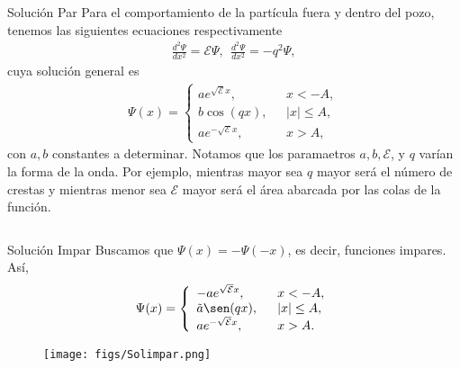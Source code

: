 \documentclass[aspectratio=1610]{beamer}
\begin{document}
\begin{frame}{Solución Par}
Para el comportamiento de la partícula fuera y dentro del pozo, tenemos las siguientes ecuaciones respectivamente
 \begin{align*}
     \frac{d^2\Psi}{dx^2} = \mathcal{E}\Psi, \:\:      \frac{d^2\Psi}{dx^2} = -q^2\Psi,
 \end{align*}
cuya solución general es 
\begin{align}
        \Psi(x) = 
        \left\{ \begin{array}{ll}
        ae^{\sqrt{\mathcal{E}}x},& \:\:\:  x < -A,
        \\
        b\cos(qx), & \:\:\: |x| \leq A,
        \\
        ae^{-\sqrt{\mathcal{E}}x},& \:\:\: x > A,
        \end{array}
        \right.
        \label{eq:Solpar}
\end{align}
con $a, b$ constantes a determinar. Notamos que los paramaetros
$a,b,\mathcal{E}$, y $q$ varían la forma de la onda. Por ejemplo, mientras mayor sea $q$ mayor será el número de crestas y mientras menor sea $\mathcal{E}$ mayor será el área abarcada por las colas de la función.
    
\begin{columns}
\column{37em}
\end{columns}
\end{frame}


\begin{frame}{Solución Impar}
Buscamos que $\Psi(x) = - \Psi(-x)$, es decir, funciones impares. Así, 
\begin{align}
        \Psi(x) = 
        \left\{ \begin{array}{ll}
        -ae^{\sqrt{\mathcal{E}}x},& \:\:\:  x < -A,
        \\
        \Tilde{a}\sen(qx), & \:\:\: |x| \leq A,
        \\
        ae^{-\sqrt{\mathcal{E}}x},& \:\:\: x > A.
        \end{array}
        \right.
        \label{eq:Solimpar}
\end{align}
\begin{figure}[h]
    \centering
    \texttt{[image: figs/Solimpar.png]}
\end{figure}
    
\begin{columns}
\column{37em}
\end{columns}
\end{frame}
\end{document}
